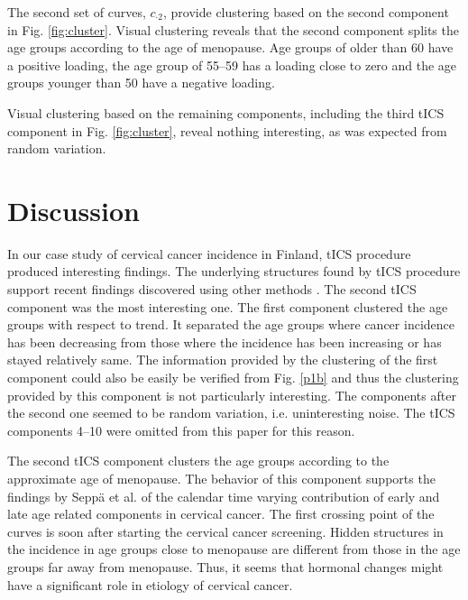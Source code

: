 \documentclass{llncs}
\begin{document}
The second set of curves, $c_{\cdot2}$, provide  clustering based on the second component in Fig. \ref{fig:cluster}. Visual clustering  reveals that the second component splits the age groups according to the age of menopause. Age groups of older than 60 have a positive loading, the age group of 55--59 has a loading close to zero and the age groups younger than 50 have a negative loading. 

Visual clustering based on the remaining components, including the third tICS component in Fig. \ref{fig:cluster}, reveal nothing interesting, as was expected from random variation.










\section{Discussion}\label{disc}

In our case study of cervical cancer incidence in Finland, tICS procedure produced interesting findings. 
The underlying structures  found by tICS procedure support recent findings discovered using other methods \cite{JP3}. The second tICS component was the most interesting one. The first component clustered the age groups with respect to trend. It separated the age groups where cancer incidence has been decreasing from those where the incidence  has been increasing or has stayed relatively same. The information provided by the clustering of the first component could also be easily be verified from Fig. \ref{p1b} and thus the clustering provided by this component is not particularly interesting. The components after the second one seemed to be random variation, i.e. uninteresting noise. The tICS components 4--10 were omitted from this paper for this reason.

The second tICS component clusters the age groups according to the approximate age of menopause. The behavior of this component supports the findings by Sepp\"{a} et al. \cite{JP3} of the calendar time varying contribution of early and late age related components in cervical cancer.  The first crossing point of the curves is soon after starting the cervical cancer screening. Hidden structures in the incidence in age groups close to menopause are different from those in the age groups far away from menopause. Thus, it seems that hormonal changes might have a significant role in etiology of cervical cancer. 
\end{document}
